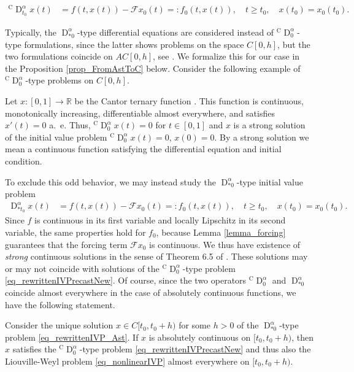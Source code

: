 \documentclass{svproc}
\newcommand{\realnumbers}{\mathbb{R}}
\newcommand{\CderivativeInput}[2]{{}^\mathrm{C}\operatorname{D}_{#2}^{#1}}
\newcommand{\AstderivativeInput}[2]{\operatorname{D}_{\ast #2}^{#1}}
\begin{document}
\begin{align}\label{eq_rewrittenIVPrecastNew}
	\CderivativeInput{\alpha}{t_0}x(t) &= f(t,x(t))-\mathcal Fx_0(t) =: f_0(t,x(t)),\quad t \geq t_0, \quad x(t_0) = x_0(t_0).
\end{align}{ Typically, the $\AstderivativeInput{\alpha}{0}$-type differential equations are considered instead of $\CderivativeInput{\alpha}{0}$-type formulations, since the latter shows problems on the space $C[0,h]$, but the two formulations coincide on $AC[0,h]$, see \cite[Section 2.3]{Webb2025}. We formalize this for our case in the Proposition \ref{prop_FromAstToC} below. Consider the following example of $\CderivativeInput{\alpha}{0}$-type problems on $C[0,h]$.
{
\begin{example}
    Let $x:[0,1]\to\realnumbers$ be the Cantor ternary function \cite[pp.\ 96ff.]{GO2003}.
    This function is continuous, monotonically increasing, differentiable almost everywhere,
    and satisfies $x'(t)=0$ a.~e. Thus, $\CderivativeInput{\alpha}{0}x(t)=0$ for $t\in [0,1]$ and $x$ is a strong solution of the initial value problem $\CderivativeInput{\alpha}{0}x(t)=0$, $x(0)=0$. By a strong solution we mean a continuous function satisfying the differential equation and initial condition. 
\end{example}
}
To exclude this odd behavior, we may instead study the $\AstderivativeInput{\alpha}{0}$-type initial value problem
\begin{align}\label{eq_rewrittenIVP_Ast}
	\AstderivativeInput{\alpha}{t_0}x(t) &= f(t,x(t))-\mathcal Fx_0(t) =: f_0(t,x(t)),\quad t \geq t_0, \quad x(t_0) = x_0(t_0).
\end{align}
Since $f$ is continuous in its first variable and locally Lipschitz in its second variable, the same properties hold for $f_0$, because Lemma \ref{lemma_forcing} guarantees that the forcing term $\mathcal F x_0$ is continuous. We thus have existence of \emph{strong} continuous solutions in the sense of Theorem 6.5 of \cite{Diethelm2010}. These solutions may or may not coincide with solutions of the $\CderivativeInput{\alpha}{0}$-type problem \eqref{eq_rewrittenIVPrecastNew}. Of course, since the two operators $\CderivativeInput{\alpha}{0}$ and $\AstderivativeInput{\alpha}{0}$ coincide almost everywhere in the case of absolutely continuous functions, we have the following statement.
\begin{proposition}\label{prop_FromAstToC}
    Consider the unique solution $x\in C[t_0,t_0+h)$ for some $h>0$ of the $\AstderivativeInput{\alpha}{0}$-type problem \eqref{eq_rewrittenIVP_Ast}. If $x$ is absolutely continuous on $[t_0,t_0+h)$, then $x$ satisfies the $\CderivativeInput{\alpha}{0}$-type problem \eqref{eq_rewrittenIVPrecastNew} and thus also the Liouville-Weyl problem \eqref{eq_nonlinearIVP} almost everywhere on $[t_0,t_0+h)$.

\end{proposition}}
\end{document}
